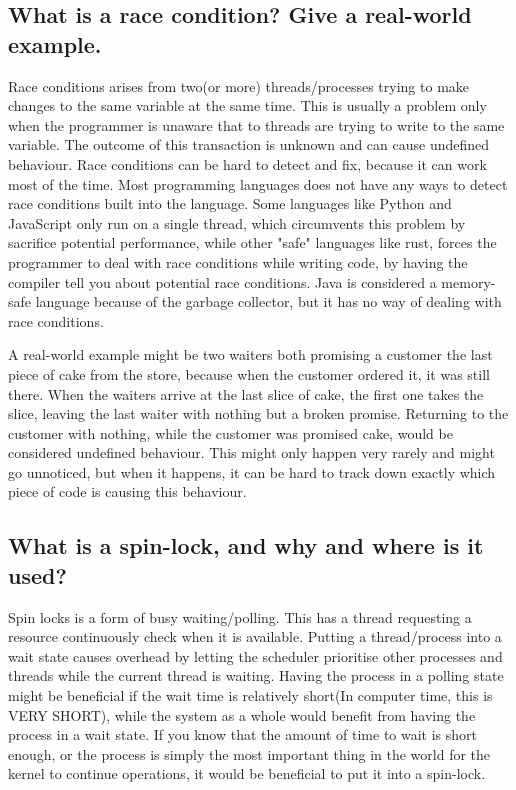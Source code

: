 \documentclass[a4paper]{article}
\begin{document}
\subsection{What is a race condition? Give a real-world example.}

Race conditions arises from two(or more) threads/processes trying to make changes to the same variable at the same time. This is usually a problem only when the programmer is unaware that to threads are trying to write to the same variable. The outcome of this transaction is unknown and can cause undefined behaviour. Race conditions can be hard to detect and fix, because it can work most of the time. Most programming languages does not have any ways to detect race conditions built into the language. Some languages like Python and JavaScript only run on a single thread, which circumvents this problem by sacrifice potential performance, while other "safe" languages like rust, forces the programmer to deal with race conditions while writing code, by having the compiler tell you about potential race conditions. Java is considered a memory-safe language because of the garbage collector, but it has no way of dealing with race conditions.

A real-world example might be two waiters both promising a customer the last piece of cake from the store, because when the customer ordered it, it was still there. When the waiters arrive at the last slice of cake, the first one takes the slice, leaving the last waiter with nothing but a broken promise. Returning to the customer with nothing, while the customer was promised cake, would be considered undefined behaviour. This might only happen very rarely and might go unnoticed, but when it happens, it can be hard to track down exactly which piece of code is causing this behaviour.

\subsection{What is a spin-lock, and why and where is it used?}

Spin locks is a form of busy waiting/polling. This has a thread requesting a resource continuously check when it is available. Putting a thread/process into a wait state causes overhead by letting the scheduler prioritise other processes and threads while the current thread is waiting. Having the process in a polling state might be beneficial if the wait time is relatively short(In computer time, this is VERY SHORT), while the system as a whole would benefit from having the process in a wait state. If you know that the amount of time to wait is short enough, or the process is simply the most important thing in the world for the kernel to continue operations, it would be beneficial to put it into a spin-lock.
\end{document}

